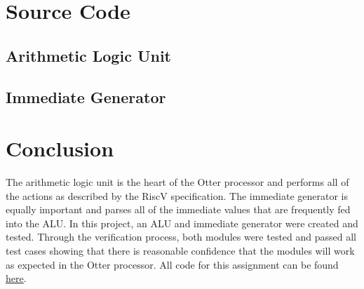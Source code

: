 \documentclass[
    a4paper, %
	12pt, %
    ]{CSSullivanBusinessReport}
\begin{document}
\begin{fullwidth}
\newpage
\section{Source Code}
\captionsetup{style=widetable}
\subsection{Arithmetic Logic Unit} %



\newpage
\subsection{Immediate Generator} %



\newpage



\section {Conclusion} %
\hypersetup{urlcolor=blue} 
The arithmetic logic unit is the heart of the Otter processor and performs all of the actions as described by the RiscV specification. The immediate generator is equally important and parses all of the immediate values that are frequently fed into the ALU. In this project, an ALU and immediate generator were created and tested. Through the verification process, both modules were tested and passed all test cases showing that there is reasonable confidence that the modules will work as expected in the Otter processor. 
All code for this assignment can be found \href{https://github.com/EthanV1920/CPE-233-Otter/tree/main}{here}.


\end{fullwidth}
\end{document}
